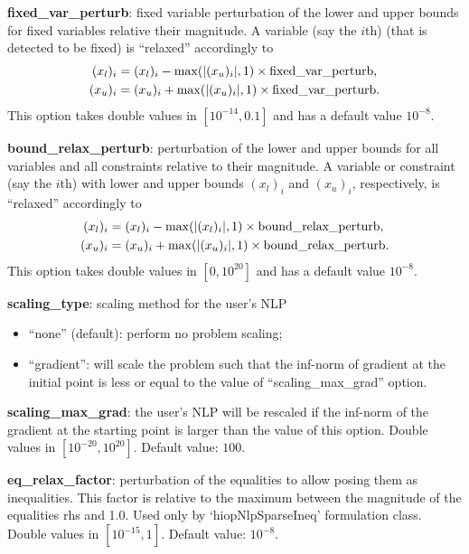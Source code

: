 \noindent \textbf{fixed\_var\_perturb}: fixed variable perturbation of the lower and upper bounds for fixed variables relative their  magnitude. A variable (say the $i$th) (that is detected to be fixed) is ``relaxed'' accordingly to 
\begin{align*}
(x_l)_i & =  (x_l)_i -  \max(|(x_u)_i|,1) \times \textnormal{fixed\_var\_perturb}, \\
(x_u)_i & =  (x_u)_i +  \max(|(x_u)_i|,1) \times \textnormal{fixed\_var\_perturb}.
\end{align*}
This option takes double values in $[10^{-14}, 0.1]$ and has a default value $10^{-8}$.
\medskip

\noindent \textbf{bound\_relax\_perturb}: perturbation of the lower and upper bounds for all variables and all constraints relative to their magnitude. A variable or constraint (say the $i$th) with lower and upper bounds $(x_l)_i$ and $(x_u)_i$, respectively,  is ``relaxed'' accordingly to 
\begin{align*}
(x_l)_i & =  (x_l)_i -  \max(|(x_l)_i|,1) \times \textnormal{bound\_relax\_perturb}, \\
(x_u)_i & =  (x_u)_i +  \max(|(x_u)_i|,1) \times \textnormal{bound\_relax\_perturb}.
\end{align*}
This option takes double values in $[0, 10^{20}]$ and has a default value $10^{-8}$.
\medskip

\noindent \textbf{scaling\_type}: scaling method for the user's NLP
\begin{itemize}
\item ``none'' (default): perform no problem scaling;
\item ``gradient'':  will scale the problem such that the inf-norm of gradient at the initial point is less or equal to the value of ``scaling\_max\_grad'' option.
\end{itemize}
\medskip

\noindent \textbf{scaling\_max\_grad}: the user's NLP will be rescaled if the inf-norm of the gradient at the starting point is larger than the value of this option. Double values in $[10^{-20}, 10^{20}]$. Default value: $100$.
\medskip

\noindent \textbf{eq\_relax\_factor}: perturbation of the equalities to allow posing them as inequalities. This factor is relative to the maximum between the magnitude of the equalities rhs and 1.0. Used only by `hiopNlpSparseIneq' formulation class. Double values in $[10^{-15}, 1]$. Default value: $10^{-8}$.
\medskip




